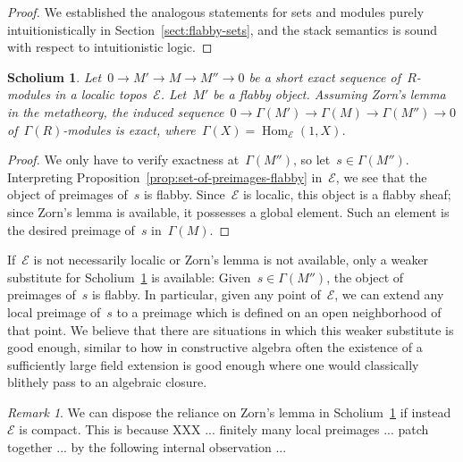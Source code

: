 \documentclass[oneside]{amsart}
\theoremstyle{definition}
\theoremstyle{plain}
\newtheorem{scholium}[defn]{Scholium}
\theoremstyle{remark}
\newtheorem{rem}[defn]{Remark}
\newcommand{\E}{\mathcal{E}}
\DeclareMathOperator{\Hom}{Hom}
\renewcommand{\_}{\mathpunct{.}\,}
\begin{document}
\begin{proof}We established the analogous statements for sets and modules purely
intuitionistically in Section~\ref{sect:flabby-sets}, and the stack semantics
is sound with respect to intuitionistic logic.
\end{proof}

\begin{scholium}\label{scholium:exact-as-presheaves}
Let~$0 \to M' \to M \to M'' \to 0$ be a short exact sequence
of~$R$-modules in a localic topos~$\E$. Let~$M'$ be a flabby object.
Assuming Zorn's lemma in the metatheory, the induced sequence~$0 \to
\Gamma(M') \to \Gamma(M) \to \Gamma(M'') \to 0$ of~$\Gamma(R)$-modules is exact,
where~$\Gamma(X) = \Hom_\E(1,X)$.\end{scholium}

\begin{proof}We only have to verify exactness at~$\Gamma(M'')$, so let~$s \in
\Gamma(M'')$. Interpreting Proposition~\ref{prop:set-of-preimages-flabby}
in~$\E$, we see that the object of preimages of~$s$ is flabby. Since~$\E$ is
localic, this object is a flabby sheaf; since Zorn's lemma is available, it
possesses a global element. Such an element is the desired preimage of~$s$
in~$\Gamma(M)$.\end{proof}

If~$\E$ is not necessarily localic or Zorn's lemma is not available, only a
weaker substitute for Scholium~\ref{scholium:exact-as-presheaves} is available:
Given~$s \in \Gamma(M'')$, the object of preimages of~$s$ is flabby. In
particular, given any point of~$\E$, we can extend any local preimage of~$s$ to
a preimage which is defined on an open neighborhood of that point. We believe
that there are situations in which this weaker substitute is good enough,
similar to how in constructive algebra often the existence of a sufficiently
large field extension is good enough where one would classically blithely pass
to an algebraic closure.

\begin{rem}We can dispose the reliance on Zorn's lemma in
Scholium~\ref{scholium:exact-as-presheaves} if instead~$\E$ is compact. This is
because XXX ... finitely many local preimages ... patch together ... by the
following internal observation ...
\end{rem}
\end{document}
